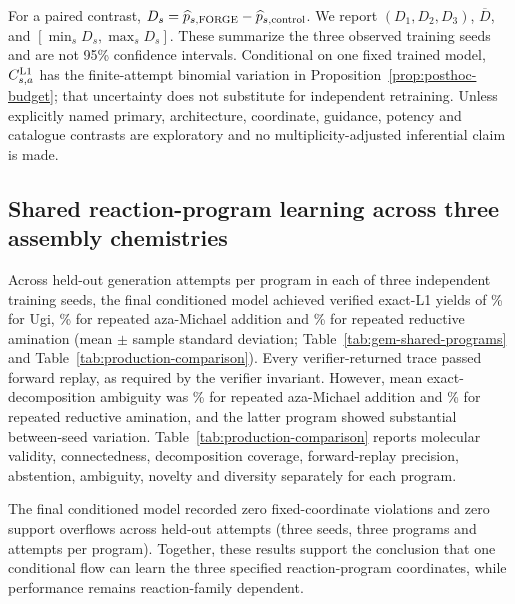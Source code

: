 \documentclass{article}
\begin{document}
For a paired contrast, $D_s=\widehat p_{s,\rm FORGE}-\widehat p_{s,\rm control}$. We report
$(D_1,D_2,D_3)$, $\overline D$, and $[\min_sD_s,\max_sD_s]$. These summarize the three observed
training seeds and are not 95\% confidence intervals. Conditional on one fixed trained model,
$C_{s,a}^{\rm L1}$ has the finite-attempt binomial variation in
Proposition~\ref{prop:posthoc-budget}; that uncertainty does not substitute for independent
retraining. Unless explicitly named primary, architecture, coordinate, guidance, potency and
catalogue contrasts are exploratory and no multiplicity-adjusted inferential claim is made.

\subsection{Shared reaction-program learning across three assembly chemistries}

Across \ForgeProseAttemptsPerProgram{} held-out generation attempts per program in each of three independent training seeds,
the final conditioned model achieved verified exact-L1 yields of
\ForgeTableOneConditionedUgiYield\% for Ugi, \ForgeTableOneConditionedBLYield\% for repeated
aza-Michael addition and \ForgeTableOneConditionedLXYield\% for repeated reductive amination
(mean $\pm$ sample standard deviation; Table~\ref{tab:gem-shared-programs} and
Table~\ref{tab:production-comparison}).
Every verifier-returned trace passed forward replay, as required by the verifier invariant. However, mean exact-
decomposition ambiguity was \ForgeTableOneBLAmbiguityPercent\% for repeated aza-Michael addition
and \ForgeTableOneLXAmbiguityPercent\% for
repeated reductive amination, and the latter program showed substantial between-seed variation.
Table~\ref{tab:production-comparison} reports molecular validity, connectedness, decomposition
coverage, forward-replay precision, abstention, ambiguity, novelty and diversity separately for
each program.

The final conditioned model recorded zero fixed-coordinate violations and zero support overflows across
\ForgeProseConditionedTotalAttempts{} held-out attempts (three seeds, three programs and
\ForgeProseAttemptsPerProgram{} attempts per program).
Together, these results support the conclusion that one conditional flow can learn the three
specified reaction-program coordinates, while performance remains reaction-family dependent.
\end{document}
